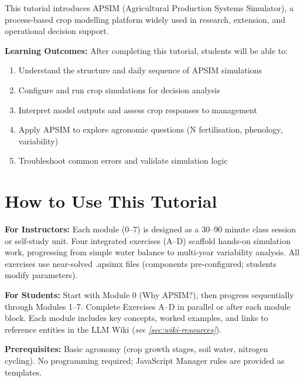 This tutorial introduces APSIM (Agricultural Production Systems Simulator), a process-based crop modelling platform widely used in research, extension, and operational decision support.

\begin{keyconceptbox}
\textbf{Learning Outcomes:}
After completing this tutorial, students will be able to:
\begin{enumerate}
  \item Understand the structure and daily sequence of APSIM simulations
  \item Configure and run crop simulations for decision analysis
  \item Interpret model outputs and assess crop responses to management
  \item Apply APSIM to explore agronomic questions (N fertilisation, phenology, variability)
  \item Troubleshoot common errors and validate simulation logic
\end{enumerate}
\end{keyconceptbox}

\section*{How to Use This Tutorial}

\textbf{For Instructors:} Each module (0--7) is designed as a 30--90 minute class session or self-study unit. Four integrated exercises (A--D) scaffold hands-on simulation work, progressing from simple water balance to multi-year variability analysis. All exercises use near-solved .apsimx files (components pre-configured; students modify parameters).

\textbf{For Students:} Start with Module 0 (Why APSIM?), then progress sequentially through Modules 1--7. Complete Exercises A--D in parallel or after each module block. Each module includes key concepts, worked examples, and links to reference entities in the LLM Wiki (\textit{see \cref{sec:wiki-resources}}).

\textbf{Prerequisites:} Basic agronomy (crop growth stages, soil water, nitrogen cycling). No programming required; JavaScript Manager rules are provided as templates.


\mainmatter

